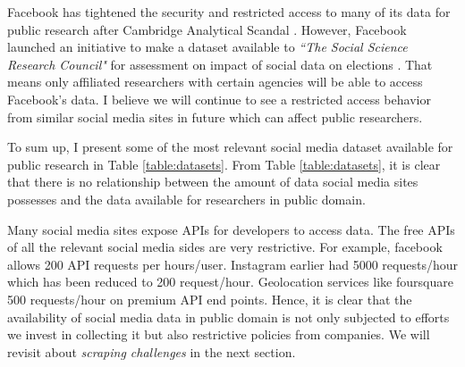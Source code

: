 Facebook has tightened the security and restricted access to many of its data for public research after Cambridge Analytical Scandal \cite{cambridge_analytica, fb_data}. However, Facebook launched an initiative to make a dataset available to {\em ``The Social Science Research Council"} for assessment on impact of social data on elections \cite{fb_initiative}. That means only affiliated researchers with certain agencies will be able to access Facebook's data. I believe we will continue to see a restricted access behavior from similar social media sites in future which can affect public researchers.

To sum up, I present some of the most relevant social media dataset available for public research in Table \ref{table:datasets}. From Table \ref{table:datasets}, it is clear that there is no relationship between the amount of data social media sites possesses and the data available for researchers in public domain.

Many social media sites expose APIs for developers to access data. The free APIs of all the relevant social media sides are very restrictive. For example, facebook allows 200 API requests per hours/user. Instagram earlier had 5000 requests/hour which has been reduced to 200 request/hour. Geolocation services like foursquare 500 requests/hour on premium API end points. Hence, it is clear that the availability of social media data in public domain is not only subjected to efforts we invest in collecting it but also restrictive policies from companies. We will revisit about {\em scraping challenges} in the next section.

